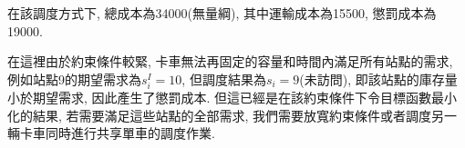 在該調度方式下, 總成本為34000(無量綱), 其中運輸成本為15500, 懲罰成本為19000.

在這裡由於約束條件較緊, 卡車無法再固定的容量和時間內滿足所有站點的需求, 例如站點9的期望需求為\(s_i^I=10\), 但調度結果為\(s_i=9\)(未訪問), 即該站點的庫存量小於期望需求, 
因此產生了懲罰成本. 但這已經是在該約束條件下令目標函數最小化的結果, 若需要滿足這些站點的全部需求, 我們需要放寬約束條件或者調度另一輛卡車同時進行共享單車的調度作業.